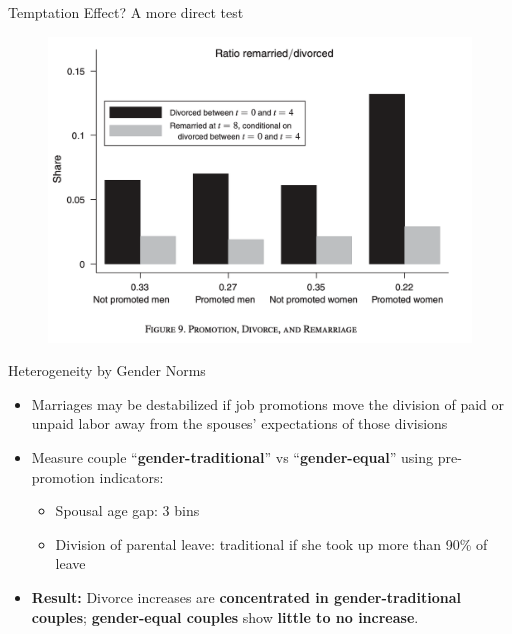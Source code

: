 \documentclass[11pt,notes=hide,aspectratio=169,mathserif]{beamer}
\begin{document}
\begin{frame}{Temptation Effect? A more direct test}
\small
\begin{figure}
  \centering
  \includegraphics[width=0.8\linewidth]{inputs/fig7.png}
  \end{figure}
\end{frame}

\begin{frame}{Heterogeneity by Gender Norms}
\small
\begin{itemize}
  \item Marriages may be destabilized if job promotions
  move the division of paid or unpaid labor away from the spouses’ expectations
  of those divisions
  \item Measure couple “\textbf{gender-traditional}” vs “\textbf{gender-equal}” using pre-promotion indicators: 
  \begin{itemize}
    \item Spousal age gap: 3 bins
    \item Division of parental leave: traditional if she took up more than 90\% of leave
  \end{itemize}
  \item \textbf{Result:} Divorce increases are \textbf{concentrated in gender-traditional couples}; \textbf{gender-equal couples} show \textbf{little to no increase}. 
\end{itemize}
\end{frame}
\end{document}
